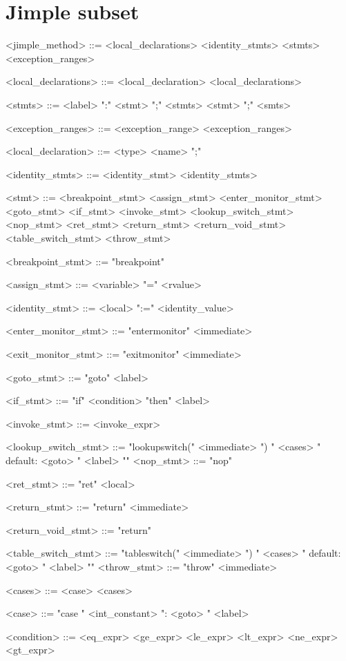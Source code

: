 \documentclass{report}
\begin{document}
\section{Jimple subset}
\begin{grammar}
<jimple_method> ::= <local_declarations> <identity_stmts> <stmts> <exception_ranges>

<local_declarations> ::= <local_declaration> <local_declarations>

<stmts> ::= <label> ":" <stmt> ";" <stmts> \alt  <stmt> ";" <smts>

<exception_ranges> ::= <exception_range> <exception_ranges>

<local_declaration> ::= <type> <name> ";"

<identity_stmts> ::= <identity_stmt> <identity_stmts>

<stmt> ::= <breakpoint_stmt> \alt <assign_stmt> \alt <enter_monitor_stmt>
<goto_stmt> \alt <if_stmt> \alt <invoke_stmt> \alt <lookup_switch_stmt> \alt <nop_stmt> \alt <ret_stmt> \alt <return_stmt> \alt <return_void_stmt> \alt <table_switch_stmt> \alt <throw_stmt>

<breakpoint_stmt> ::= "breakpoint"

<assign_stmt> ::= <variable> "=" <rvalue>

<identity_stmt> ::= <local> ":=" <identity_value>

<enter_monitor_stmt> ::= "entermonitor" <immediate>

<exit_monitor_stmt> ::= "exitmonitor" <immediate>

<goto_stmt> ::= "goto" <label>

<if_stmt> ::= "if" <condition> "then" <label>

<invoke_stmt> ::= <invoke_expr>

<lookup_switch_stmt> ::= "lookupswitch(" <immediate> ") {" <cases> " default: <goto> " <label> "}" <nop_stmt> ::= "nop"

<ret_stmt> ::= "ret" <local>

<return_stmt> ::= "return" <immediate>

<return_void_stmt> ::= "return" 

<table_switch_stmt> ::= "tableswitch(" <immediate> ") {" <cases> " default: <goto> " <label> "}" <throw_stmt> ::= "throw" <immediate>

<cases> ::= <case> <cases>

<case> ::= "case " <int_constant> ": <goto> " <label>

<condition> ::= <eq_expr> \alt <ge_expr> \alt <le_expr> \alt <lt_expr> \alt <ne_expr> \alt <gt_expr>


\end{grammar}
\end{document}
